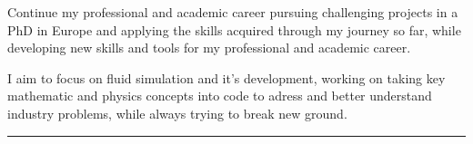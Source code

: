 \documentclass[a4paper,10pt]{article}
\newlength{\cvcolumngapwidth}
\newlength{\cvleftcolumnwidth}
\newlength{\cvrightcolumnwidth}
\newcommand{\cvsectionstyle}[1]{{\normalsize\cvsectionfont\textcolor{cvsectioncolor}{#1}}}
\newcommand{\cvheadingstyle}[1]{{\normalsize\cvheadingfont\textcolor{cvheadingcolor}{#1}}}
\newlength{\cvafteritemskipamount}
\newlength{\cvaftersectionskipamount}
\newlength{\cvbetweensectionandheadingextraskipamount}
\newlength{\cvparskip}
\newcommand{\cvsection}[1]{
    \begin{minipage}[t]{\cvleftcolumnwidth}
        \raggedleft\cvsectionstyle{#1}
    \end{minipage}%
    \hspace{\cvcolumngapwidth}%
    \begin{minipage}[t]{\cvrightcolumnwidth}
        \textcolor{cvrulecolor}{\rule{\cvrightcolumnwidth}{0.3mm}}
    \end{minipage}

    \vspace{\cvaftersectionskipamount}
}
\newcommand{\cvitem}[2]{
    \begin{minipage}[t]{\cvleftcolumnwidth}
        \raggedleft #1
    \end{minipage}%
    \hspace{\cvcolumngapwidth}%
    \begin{minipage}[t]{\cvrightcolumnwidth}
        \setlength{\parskip}{\cvparskip} #2
    \end{minipage}

    \vspace{\cvafteritemskipamount}
}
\begin{document}
\cvitem{\cvheadingstyle{}}{


    Continue my professional and academic career pursuing challenging projects in a PhD in Europe and applying the skills acquired
    through my journey so far, while developing new skills and tools for my professional and academic career.

    I aim to focus on fluid simulation and it's development, working on taking key mathematic and physics concepts into
    code to adress and better understand industry problems, while always trying to break new ground.
}


\cvsection{WORK EXPERIENCE}
\end{document}
